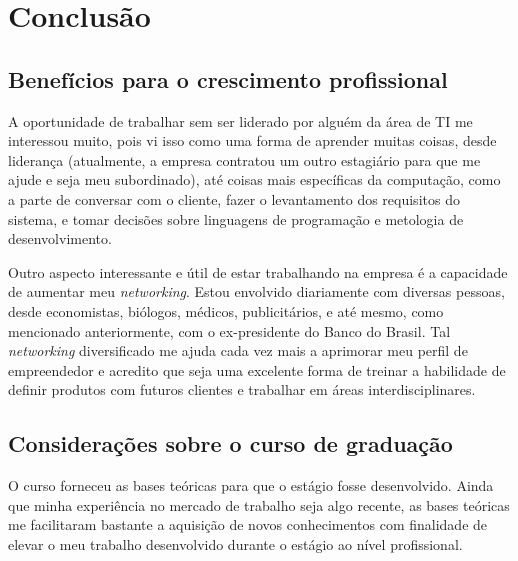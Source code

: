 \chapter{Conclusão}
\label{chap:conclusao}

\section{Benefícios para o crescimento profissional}

A oportunidade de trabalhar sem ser liderado por alguém da área de TI me interessou muito, pois vi isso como uma 
forma de aprender muitas coisas, desde liderança (atualmente, a empresa contratou um outro estagiário para que me
ajude e seja meu subordinado), até coisas mais específicas da computação, como a parte de conversar com o cliente,
fazer o levantamento dos requisitos do sistema, e tomar decisões sobre linguagens de programação e metologia de desenvolvimento.

Outro aspecto interessante e útil de estar trabalhando na empresa é a capacidade de aumentar meu \textit{networking}.
Estou envolvido diariamente com diversas pessoas, desde economistas, biólogos, médicos, publicitários, e até mesmo, como mencionado
anteriormente, com o ex-presidente do Banco do Brasil. Tal \textit{networking} diversificado me ajuda cada vez mais a aprimorar 
meu perfil de empreendedor e acredito que seja uma excelente forma de treinar a habilidade de definir produtos com futuros clientes
e trabalhar em áreas interdisciplinares.




\section{Considerações sobre o curso de graduação}

O curso forneceu as bases teóricas para que o estágio fosse desenvolvido. Ainda que minha experiência no mercado de trabalho seja algo recente, 
as bases teóricas me facilitaram bastante a aquisição de novos conhecimentos com finalidade de elevar o meu trabalho desenvolvido 
durante o estágio ao nível profissional.



